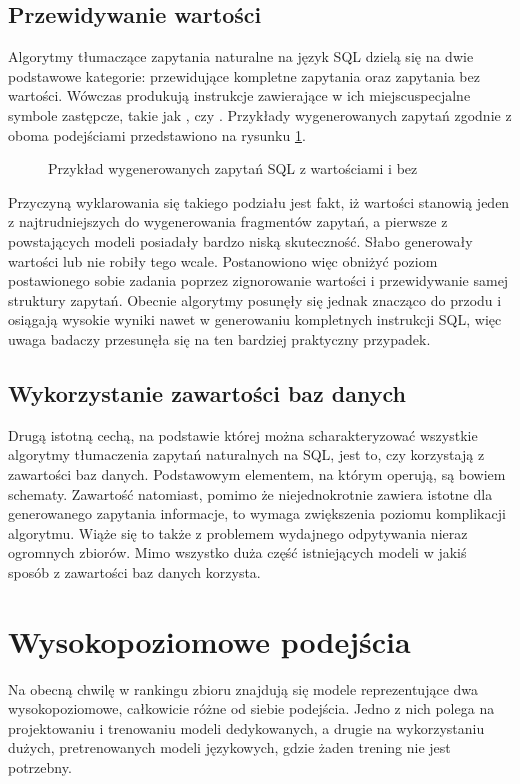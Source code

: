 \subsection{Przewidywanie wartości}
Algorytmy tłumaczące zapytania naturalne na język SQL dzielą się na dwie podstawowe kategorie: przewidujące kompletne zapytania oraz zapytania bez wartości. Wówczas produkują instrukcje zawierające w ich miejscuspecjalne symbole zastępcze, takie jak , czy . Przykłady wygenerowanych zapytań zgodnie z oboma podejściami przedstawiono na rysunku \ref{fig:query-values}.

\begin{figure}[ht!]
  \centering
  
  \caption{Przykład wygenerowanych zapytań SQL z wartościami i bez}
  \label{fig:query-values}
\end{figure}

Przyczyną wyklarowania się takiego podziału jest fakt, iż wartości stanowią jeden z najtrudniejszych do wygenerowania fragmentów zapytań, a pierwsze z powstających modeli posiadały bardzo niską skuteczność. Słabo generowały wartości lub nie robiły tego wcale. Postanowiono więc obniżyć poziom postawionego sobie zadania poprzez zignorowanie wartości i przewidywanie samej struktury zapytań. Obecnie algorytmy posunęły się jednak znacząco do przodu i osiągają wysokie wyniki nawet w generowaniu kompletnych instrukcji SQL, więc uwaga badaczy przesunęła się na ten bardziej praktyczny przypadek.

\subsection{Wykorzystanie zawartości baz danych}
Drugą istotną cechą, na podstawie której można scharakteryzować wszystkie algorytmy tłumaczenia zapytań naturalnych na SQL, jest to, czy korzystają z zawartości baz danych. Podstawowym elementem, na którym operują, są bowiem schematy. Zawartość natomiast, pomimo że niejednokrotnie zawiera istotne dla generowanego zapytania informacje, to wymaga zwiększenia poziomu komplikacji algorytmu. Wiąże się to także z problemem wydajnego odpytywania nieraz ogromnych zbiorów. Mimo wszystko duża część istniejących modeli w jakiś sposób z zawartości baz danych korzysta.

\section{Wysokopoziomowe podejścia}
Na obecną chwilę w rankingu zbioru  znajdują się modele reprezentujące dwa wysokopoziomowe, całkowicie różne od siebie podejścia. Jedno z nich polega na projektowaniu i trenowaniu modeli dedykowanych, a drugie na wykorzystaniu dużych, pretrenowanych modeli językowych, gdzie żaden trening nie jest potrzebny. 

